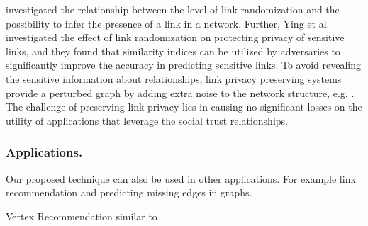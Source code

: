 \cite{zheleva2008preserving,ying2008randomizing} investigated the relationship between the level of link randomization and the possibility to infer the presence of a link in a network. Further, Ying et al. \cite{ying2009link} investigated the effect of link randomization on protecting privacy of sensitive links, and they found that similarity indices can be utilized by adversaries to significantly improve the accuracy in predicting sensitive links.
To avoid revealing the sensitive information about relationships, link privacy preserving systems provide a perturbed graph by adding extra noise to the network structure, e.g. \cite{hay2008resisting,mittalNDSS13,ying2008randomizing,zheleva2008preserving}. The challenge of preserving link privacy lies in causing no significant losses on the utility of applications that leverage the social trust relationships.






\subsubsection{Applications.} Our proposed technique can also be used in other applications. For example link recommendation and predicting missing edges in graphs.

Vertex Recommendation similar to \cite{ou2016asymmetric} 

